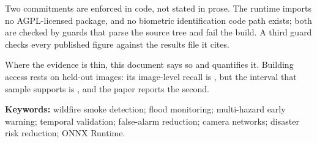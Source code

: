 Two commitments are enforced in code, not stated in prose. The runtime
imports no AGPL-licensed package, and no biometric identification code path
exists; both are checked by guards that parse the source tree and fail the
build. A third guard checks every published figure against the results file it
cites.

Where the evidence is thin, this document says so and quantifies it. Building
access rests on \BuildingTestImages{} held-out images: its image-level recall
is \BuildingImageRecall, but the interval that sample supports is
\BuildingImageRecallCI, and the paper reports the second.

\medskip
\noindent\textbf{Keywords:} wildfire smoke detection; flood monitoring;
multi-hazard early warning; temporal validation; false-alarm reduction;
camera networks; disaster risk reduction; ONNX Runtime.
